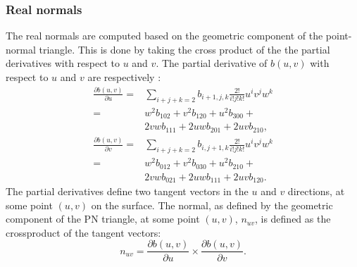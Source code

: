 \subsubsection{Real normals}
\label{sss:method:normals:realNormals}
	The real normals are computed based on the geometric component of the point-normal triangle. This is done by taking the cross product of the the partial derivatives with respect to $u$ and $v$. The partial derivative of $b(u,v)$ with respect to $u$ and $v$ are respectively \cite{farin2014curves}:
	\begin{align} \label{eq:method:normal:partialU}
		\frac{\partial b(u,v)}{\partial u} ={}& \sum_{i + j + k = 2} b_{i+1, j, k} \frac{2!}{i!j!k!} u^i v^j w^k  \nonumber\\
									   ={}& w^2 b_{102} + v^2 b_{120} + u^2 b_{300} + \\
									    {}& 2 v w b_{111} + 2 u w b_{201} + 2 u v b_{210}, \nonumber
	\end{align}
	\begin{align} \label{eq:method:normal:partialV}
		\frac{\partial b(u,v)}{\partial v} ={}& \sum_{i + j + k = 2} b_{i, j + 1, k} \frac{2!}{i!j!k!}u^i v^j w^k \nonumber \\
										   ={}& w^2 b_{012} + v^2 b_{030} + u^2 b_{210} + \\
										    {}& 2 v w b_{021} + 2 u w b_{111} + 2 u v b_{120}. \nonumber
	\end{align}
	The partial derivatives define two tangent vectors in the $u$ and $v$ directions, at some point $(u,v)$ on the surface. The normal, as defined by the geometric component of the PN triangle, at some point $(u,v)$, $n_{uv}$, is defined as the crossproduct of the tangent vectors:
	\begin{equation}\label{eq:method:normal:realNormal}
		n_{uv} = \frac{\partial b(u,v)}{\partial u} \times \frac{\partial b(u,v)}{\partial v}.
	\end{equation}

